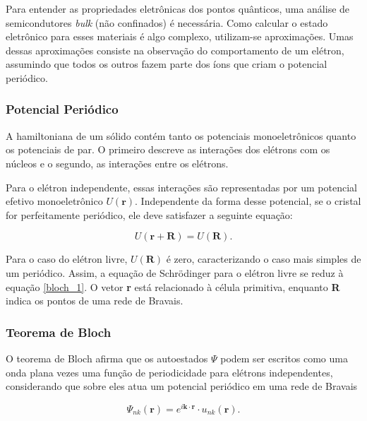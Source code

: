 \par Para entender as propriedades eletrônicas dos pontos quânticos, uma análise de semicondutores \textit{bulk} (não confinados) é necessária. Como calcular o estado eletrônico para esses materiais é algo complexo, utilizam-se aproximações. Umas dessas aproximações consiste na observação do comportamento de um elétron, assumindo que todos os outros fazem parte dos íons que criam o potencial periódico.

\subsubsection{Potencial Periódico}

	\par A hamiltoniana\cite{qm_fis5} de um sólido contém tanto os potenciais monoeletrônicos quanto os potenciais de par. O primeiro descreve as interações dos elétrons com os núcleos e o segundo, as interações entre os elétrons. 

	\par Para o elétron independente, essas interações são representadas por um potencial efetivo monoeletrônico $U(\mathbf{r})$. Independente da forma desse potencial, se o cristal for perfeitamente periódico, ele deve satisfazer a seguinte equação:

	\begin{equation}
		\label{bloch_1}
		U(\mathbf{r}+\mathbf{R}) = U(\mathbf{R}).
	\end{equation}

	Para o caso do elétron livre, $U(\mathbf{R})$ é zero, caracterizando o caso mais simples de um periódico. Assim, a equação de Schrödinger para o elétron livre se reduz à equação \eqref{bloch_1}. O vetor \textbf{r} está relacionado à célula primitiva, enquanto \textbf{R} indica os pontos de uma rede de Bravais\cite{qm_fis2}.

\subsubsection{Teorema de Bloch}

	\par O teorema de Bloch\cite{qm_fis5} afirma que os autoestados $\Psi$ podem ser escritos como uma onda plana vezes uma função de periodicidade para elétrons independentes, considerando que sobre eles atua um potencial periódico em uma rede de Bravais

	\begin{equation}
		\label{bloch_2}
		\Psi_{nk}(\mathbf{r})= e^{i\mathbf{k} \cdot \mathbf{r}}\cdot u_{nk}(\mathbf{r}).
	\end{equation}

